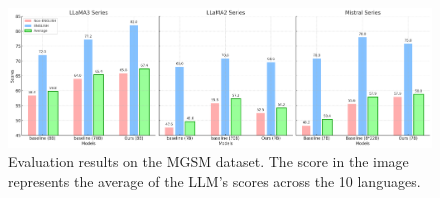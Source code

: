 \documentclass[11pt]{article}
\begin{document}
\begin{figure}[h]
\begin{center}
\includegraphics[width=\linewidth]{picture/figure6_sota.png}
\end{center}
\caption{Evaluation results on the MGSM dataset. The score in the image represents the average of the LLM's scores across the 10 languages.}
\end{figure}
\end{document}
